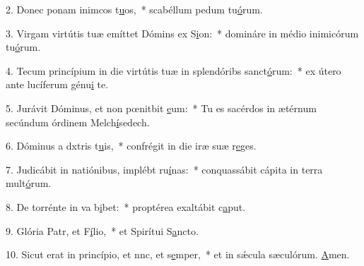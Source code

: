 2. Donec ponam inimcos t\uline{u}os,~* scabéllum pedum tu\uline{ó}rum.\par 
3. Virgam virtútis tuæ emíttet Dómins ex S\uline{i}on:~* domináre in médio inimicórum tu\uline{ó}rum.\par 
4. Tecum princípium in die virtútis tuæ in splendóribs sanct\uline{ó}rum:~* ex útero ante lucíferum génu\uline{i} te.\par 
5. Jurávit Dóminus, et non pœnitbit \uline{e}um:~* Tu es sacérdos in ætérnum secúndum órdinem Melch\uline{í}sedech.\par 
6. Dóminus a dxtris t\uline{u}is,~* confrégit in die iræ suæ r\uline{e}ges.\par 
7. Judicábit in natiónibus, implébt ru\uline{í}nas:~* conquassábit cápita in terra mult\uline{ó}rum.\par 
8. De torrénte in va b\uline{i}bet:~* proptérea exaltábit c\uline{a}put.\par 
9. Glória Patr, et F\uline{í}lio,~* et Spirítui S\uline{a}ncto.\par 
10. Sicut erat in princípio, et nnc, et s\uline{e}mper,~* et in sǽcula sæculórum. \uline{A}men.\par 

